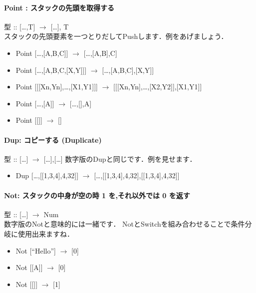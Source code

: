 \paragraph{Point : スタックの先頭を取得する}

型 :: {[}\ldots{},T{]} $\to$ {[}\ldots{}{]},
T\\スタックの先頭要素を一つとりだしてPushします．例をあげましょう．

\begin{itemize}
\item
  Point {[}\ldots{},{[}A,B,C{]}{]} $\to$
  {[}\ldots{},{[}A,B{]},C{]}
\item
  Point {[}\ldots{},{[}A,B,C,{[}X,Y{]}{]}{]} $\to$
  {[}\ldots{},{[}A,B,C{]},{[}X,Y{]}{]}
\item
  Point {[}{[}{[}Xn,Yn{]},\ldots{},{[}X1,Y1{]}{]}{]} $\to$
  {[}{[}{[}Xn,Yn{]},\ldots{},{[}X2,Y2{]}{]},{[}X1,Y1{]}{]}
\item
  Point {[}\ldots{},{[}A{]}{]} $\to$ {[}\ldots{},{[}{]},A{]}
\item
  Point {[}{[}{]}{]} $\to$ {[}{]}
\end{itemize}

\paragraph{Dup: コピーする (Duplicate)}

型 :: {[}\ldots{}{]} $\to$ {[}\ldots{}{]},{[}\ldots{}{]}
数字版のDupと同じです．例を見せます．

\begin{itemize}
\item
  Dup {[}\ldots{},{[}{[}1,3,4{]},4,32{]}{]} $\to$
  {[}\ldots{},{[}{[}1,3,4{]},4,32{]},{[}{[}1,3,4{]},4,32{]}{]}
\end{itemize}

\paragraph{Not: スタックの中身が空の時 1 を,それ以外では 0 を返す}

型 :: {[}\ldots{}{]} $\to$
Num\\数字版のNotと意味的には一緒です．
NotとSwitchを組み合わせることで条件分岐に使用出来ますね．

\begin{itemize}
\item
  Not {[}``Hello''{]} $\to$ {[}0{]}
\item
  Not {[}{[}A{]}{]} $\to$ {[}0{]}
\item
  Not {[}{[}{]}{]} $\to$ {[}1{]}
\end{itemize}

